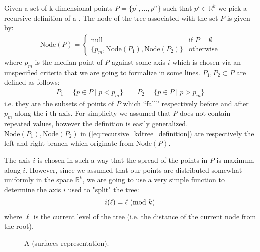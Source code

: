 \documentclass{article}
\begin{document}
\section{\kdtree{}}
Given a set of k-dimensional points $P = \{p^1, \dots, p^n\}$ such that
$p^i \in \mathbb{R}^k$ we pick a recursive definition of a \kdtree{}
\cite{skrodzki2019kd}. The node of the tree associated with the set $P$ is given
by:
\begin{gather} \label{eq:recursive_kdtree_definition}
    \text{Node}(P) = \begin{cases}
        \text{null} &\text{if } P = \emptyset\\
        \{p_m, \text{Node}(P_1), \text{Node}(P_2)\} &\text{otherwise}
    \end{cases}
\end{gather}
where $p_m$ is the median point of $P$ against some axis $i$ which is chosen
via an unspecified criteria that we are going to formalize in some lines.
$P_1, P_2 \subset P$ are defined as follows:
\begin{gather*}
    P_1 = \{p \in P \mid p < p_m\} \qquad P_2 = \{p \in P \mid p > p_m\}
\end{gather*}
i.e. they are the subsets of points of $P$ which ``fall'' respectively before
and after $p_m$ along the i-th axis. For simplicity we assumed that $P$ does not
contain repeated values, however the definition is easily generalized.
$\text{Node}(P_1), \text{Node}(P_2)$ in (\ref*{eq:recursive_kdtree_definition})
are respectively the left and right branch which originate from
$\text{Node}(P)$.

The axis $i$ is chosen in such a way that the spread of the points in $P$ is
maximum along $i$. However, since we assumed that our points are distributed
somewhat uniformly in the space $\mathbb{R}^k$, we are going to use a very
simple function to determine the axis $i$ used to "split" the tree:
\begin{gather} \label{eq:axis_criteria}
    i(\ell) = \ell \ (\mathrm{mod}\ k)
\end{gather}
where $\ell$ is the current level of the tree (i.e. the distance of the current
node from the root).

\begin{figure}[b!]
    \caption{A \kdtree{} (surfaces representation).}
    \label{fig:kdtree_surfaces_progression}
\end{figure}
\end{document}
